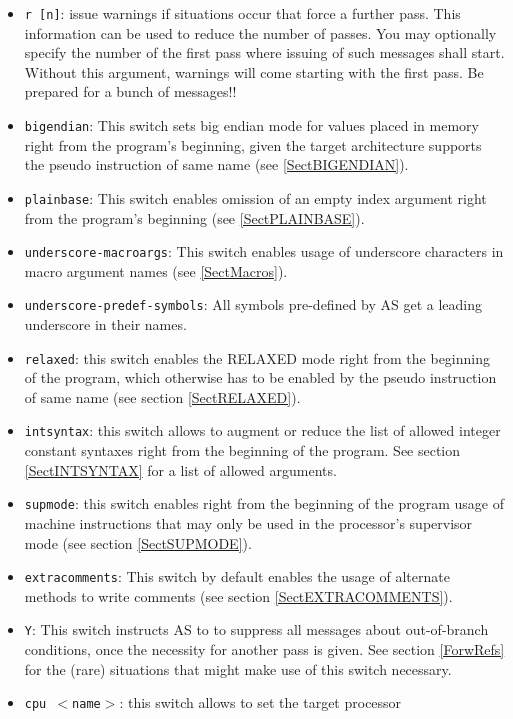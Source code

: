 \documentclass[12pt,twoside]{report}
\newcommand{\tty}[1]{{\tt #1}}
\newcommand{\asname}{{AS}}
\begin{document}
\begin{itemize}
{      processor of \asname{} shall be used.}
\item{\tty{r [n]}: issue warnings if situations occur that force a further
      pass. This information can be used to reduce the number of
      passes.  You may optionally specify the number of the
      first pass where issuing of such messages shall start.
      Without this argument, warnings will come starting with
      the first pass.  Be prepared for a bunch of messages!!}
\item{\tty{bigendian}: This switch sets big endian mode for values placed
      in memory right from the program's beginning, given the target
      architecture supports the pseudo instruction of same name (see
      \ref{SectBIGENDIAN}).}
\item{\tty{plainbase}: This switch enables omission of an empty index
      argument right from the program's beginning (see \ref{SectPLAINBASE}).}
\item{\tty{underscore-macroargs}: This switch enables usage of underscore characters
      in macro argument names (see \ref{SectMacros}).}
\item{\tty{underscore-predef-symbols}: All symbols pre-defined by \asname{}
      get a leading underscore in their names.}
\item{\tty{relaxed}: this switch enables the RELAXED mode right from the
      beginning of the program, which otherwise has to be enabled by the
      pseudo instruction of same name (see section \ref{SectRELAXED}).}
\item{\tty{intsyntax}: this switch allows to augment or reduce the list of
      allowed integer constant syntaxes right from the beginning of the
      program.  See section \ref{SectINTSYNTAX} for a list of allowed
      arguments.}
\item{\tty{supmode}: this switch enables right from the beginning of the
      program usage of machine instructions that may only be used in the
      processor's supervisor mode (see section \ref{SectSUPMODE}).}
\item{\tty{extracomments}: This switch by default enables the usage of
      alternate methods to write comments (see section \ref{SectEXTRACOMMENTS}).}
\item{\tty{Y}: This switch instructs \asname{} to to suppress all messages about
      out-of-branch conditions, once the necessity for another pass is given.
      See section \ref{ForwRefs} for the (rare) situations that might make
      use of this switch necessary.}
\item{\tty{cpu $<$name$>$}: this switch allows to set the target processor
}
\end{itemize}
\end{document}
